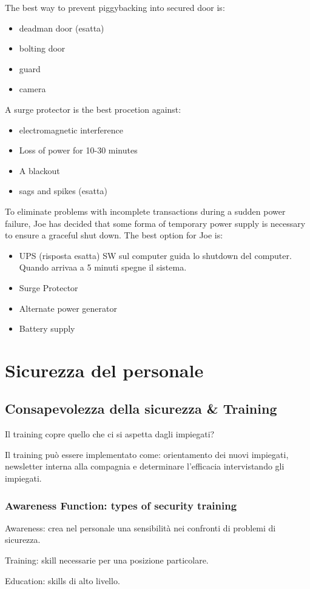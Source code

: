 The best way to prevent piggybacking into secured door is:
\begin{itemize}
\item deadman door (esatta)
\item bolting door
\item guard
\item camera
\end{itemize}


A surge protector is the best procetion against:
\begin{itemize}
\item electromagnetic interference
\item Loss of power for 10-30 minutes
\item A blackout
\item sags and spikes (esatta)
\end{itemize}



To eliminate problems with incomplete transactions during a sudden power 
failure, Joe has decided that some forma of temporary power supply is necessary 
to ensure a graceful shut down. The best option for Joe is:

\begin{itemize}
\item UPS (risposta esatta) %
SW sul computer guida lo shutdown del computer. Quando arrivaa a 5 minuti spegne 
il sistema.
\item Surge Protector 
\item Alternate power generator
\item Battery supply
\end{itemize}

\section{Sicurezza del personale}

\subsection{Consapevolezza della sicurezza \& Training}

Il training copre quello che ci si aspetta dagli impiegati?

Il training può essere implementato come: orientamento dei nuovi impiegati, 
newsletter interna alla compagnia e determinare l'efficacia intervistando gli 
impiegati.



\subsubsection{Awareness Function: types of security training}

Awareness: crea nel personale una sensibilità nei confronti di problemi di 
sicurezza.

Training: skill necessarie per una posizione particolare.

Education: skills di alto livello.
